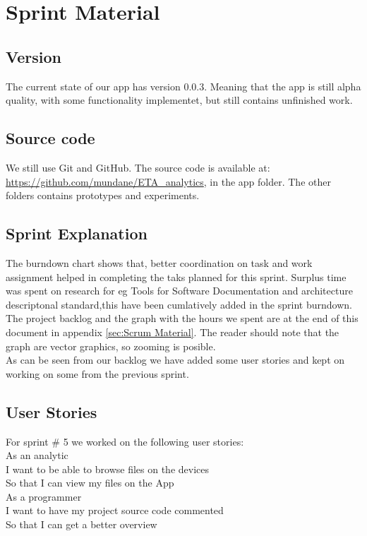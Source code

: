 \section{Sprint Material} %
\label{sec:Sprint Material}
\subsection{Version} %
\label{sub:Version}
The current state of our app has version 0.0.3. Meaning that the app is still alpha quality, with some functionality implementet, but still contains unfinished work.
\subsection{Source code} %
\label{sub:Source code}
We still use Git and GitHub. The source code is available at: \url{https://github.com/mundane/ETA_analytics}, in the app folder. The other folders contains prototypes and experiments.
\subsection{Sprint Explanation}
The burndown chart shows that, better coordination on task and work assignment helped in completing the taks planned for this sprint.
Surplus time was spent on research for eg Tools for Software Documentation and architecture descriptonal standard,this have been cumlatively added in the sprint burndown.
The project backlog and the graph with the hours we spent are at the end of this document in appendix \ref{sec:Scrum Material}. The reader should note that the graph are vector graphics, so zooming is posible. \\
As can be seen from our backlog we have added some user stories and kept on working on some from the previous sprint.
\subsection{User Stories}
For sprint \# 5 we worked on the following user stories: \\

As an analytic \\
I want to be able to browse files on the devices\\
So that I can view my files on the App \\

As a programmer\\
I want to have my project source code commented  \\
So that I can get a better overview \\

